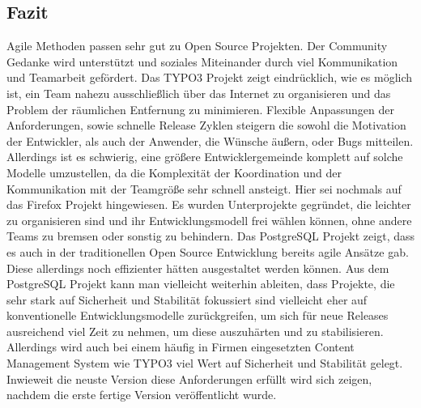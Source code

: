   \subsection{Fazit}
  Agile Methoden passen sehr gut zu Open Source Projekten. Der Community Gedanke wird unterstützt und soziales Miteinander durch viel Kommunikation und Teamarbeit gefördert. Das TYPO3 Projekt zeigt eindrücklich, wie es möglich ist, ein Team nahezu ausschließlich über das Internet zu organisieren und das Problem der räumlichen Entfernung zu minimieren. Flexible Anpassungen der Anforderungen, sowie schnelle Release Zyklen steigern die sowohl die Motivation der Entwickler, als auch der Anwender, die Wünsche äußern, oder Bugs mitteilen. Allerdings ist es schwierig, eine größere Entwicklergemeinde komplett auf solche Modelle umzustellen, da die Komplexität der Koordination und der Kommunikation mit der Teamgröße sehr schnell ansteigt. Hier sei nochmals auf das Firefox Projekt hingewiesen. Es wurden Unterprojekte gegründet, die leichter zu organisieren sind und ihr Entwicklungsmodell frei wählen können, ohne andere Teams zu bremsen oder sonstig zu behindern. Das PostgreSQL Projekt zeigt, dass es auch in der traditionellen Open Source Entwicklung bereits agile Ansätze gab. Diese allerdings noch effizienter hätten ausgestaltet werden können. Aus dem PostgreSQL Projekt kann man vielleicht weiterhin ableiten, dass Projekte, die sehr stark auf Sicherheit und Stabilität fokussiert sind vielleicht eher auf konventionelle Entwicklungsmodelle zurückgreifen, um sich für neue Releases ausreichend viel Zeit zu nehmen, um diese auszuhärten und zu stabilisieren. Allerdings wird auch bei einem häufig in Firmen eingesetzten Content Management System wie TYPO3 viel Wert auf Sicherheit und Stabilität gelegt. Inwieweit die neuste Version diese Anforderungen erfüllt wird sich zeigen, nachdem die erste fertige Version veröffentlicht wurde.



